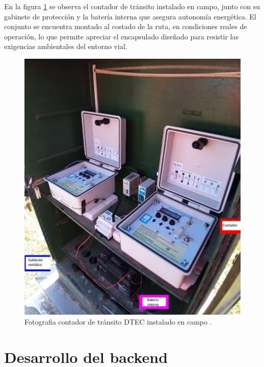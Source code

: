 \begin{itemize}
\begin{itemize}
En la figura \ref{fig:foto_gabinete} se observa el contador de tránsito instalado en campo, junto con su gabinete de protección y la batería interna que asegura autonomía energética. El conjunto se encuentra montado al costado de la ruta, en condiciones reales de operación, lo que permite apreciar el encapsulado diseñado para resistir las exigencias ambientales del entorno vial.


\begin{figure}[H]
  \centering
  \includegraphics[width=1\linewidth]{./Figures/fotoGabinete.jpeg}
  \caption{Fotografia contador de tránsito DTEC instalado en campo \protect\footnotemark.}
  \label{fig:foto_gabinete}
\end{figure}

\end{itemize}

\end{itemize}

\section{Desarrollo del backend}

